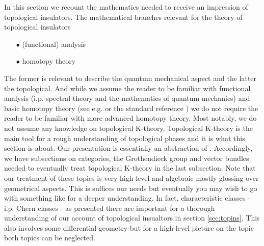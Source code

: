 \nocite{8b5861fc}
\nocite{c7f15065}
In this section we recount the mathematics needed to receive an impression of topological insulators. The mathematical branches relevant for the theory of topological insulators
\begin{enumerate}
\item[$\bullet$]
  (functional) analysis
\item[$\bullet$]
  homotopy theory
\end{enumerate}
The former is relevant to describe the quantum mechanical aspect and the latter the topological. And while we assume the reader to be familiar with functional analysis (i.p. spectral theory and the mathematics of quantum mechanics) and basic homotopy theory (see e.g. \cite{catctxphy} or the standard reference \cite{8b5861fc}) we do not require the reader to be familiar with more advanced homotopy theory. Most notably, we do not assume any knowledge on topological K-theory. Topological K-theory is the main tool for a rough understanding of topological phases and it is what this section is about. Our presentation is essentially an abstraction of \cite{c7f15065}. Accordingly, we have subsections on categories, the Grothendieck group and vector bundles needed to eventually treat topological K-theory in the last subsection. Note that our treatment of these topics is very high-level and algebraic mostly glossing over geometrical aspects. This is suffices our needs but eventually you may wish to go with something like \cite{c7f15065} for a deeper understanding. In fact, characteristic classes - i.p. Chern classes - as presented there are important for a thorough understanding of our account of topological insualtors in section \ref{sec:topins}. This also involves some differential geometry but for a high-level picture on the topic both topics can be neglected.
\\
